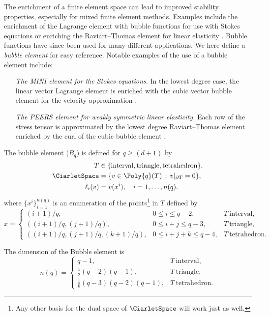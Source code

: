 The enrichment of a finite element space can lead to improved
stability properties, especially for mixed finite element
methods. Examples include the enrichment of the Lagrange element with
bubble functions for use with Stokes equations or enriching the
Raviart--Thomas element for linear elasticity
\citep{ArnoldBrezziDouglas1984, ArnoldBrezziFortin1984}. Bubble
functions have since been used for many different applications. We
here define a \emph{bubble element} for easy reference. Notable
examples of the use of a bubble element include:
\begin{itemize}
\item[\emph{The MINI element for the Stokes equations.}]
  In the lowest degree case, the linear vector Lagrange element is
  enriched with the cubic vector bubble element for the velocity
  approximation \citep{ArnoldBrezziFortin1984}.
\item[\emph{The PEERS element for weakly symmetric linear elasticity.}]
  Each row of the stress tensor is approximated by the lowest degree
  Raviart--Thomas element enriched by the curl of the cubic bubble
  element \citep{ArnoldBrezziDouglas1984}.
\end{itemize}

\begin{definition}
  The bubble element ($B_q$) is defined for $q \geqslant (d+1)$ by
  \begin{align}
    T &\in \{ \mathrm{interval}{}, \mathrm{triangle}{}, \mathrm{tetrahedron}{}\}, \\
    \CiarletSpace &= \{ v \in \Poly{q}(T) \, : \, v|_{\partial T} = 0 \}, \\
    \ell_i(v) &= v(x^i), \quad i = 1, \dots, n(q).
  \end{align}
  where $\{ x^i \}_{i=1}^{n(q)}$ is an enumeration of the
  points\footnote{Any other basis for the dual space of
    $\CiarletSpace$ will work just as well.} in $T$ defined by
  \begin{equation}
    x =
    \left \{
    \begin{array}{lll}
      (i + 1)/q,                   & 0 \leqslant i \leqslant q - 2,         & T~\mathrm{interval}, \\
      ((i+1)/q, (j+1)/q),          & 0 \leqslant i + j \leqslant q - 3,     & T~\mathrm{triangle}, \\
      ((i+1)/q, (j+1)/q, (k+1)/q), & 0 \leqslant i + j + k \leqslant q - 4, & T~\mathrm{tetrahedron}.
    \end{array}
    \right.
  \end{equation}
\end{definition}
The dimension of the Bubble element is
\begin{equation}
  n(q) =
    \left \{
    \begin{array}{ll}
      q - 1, & T~\mathrm{interval}, \\
      \frac{1}{2} (q - 2) (q - 1), & T~\mathrm{triangle}, \\
      \frac{1}{6} (q - 3) (q - 2) (q - 1), & T~\mathrm{tetrahedron}.
    \end{array}
    \right.
\end{equation}

